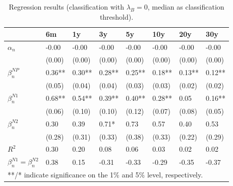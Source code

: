 \documentclass[11pt,a4paper,english,oneside]{book}
\numberwithin{equation}{chapter}
\begin{document}
\begin{table}[h] %
	\centering %
	\begin{tabular}{ p{2cm}  p{1cm} p{1cm} p{1cm} p{1cm} p{1cm} p{1cm} p{1cm} } %
		\toprule %
		& 6m 		& 1y 		& 3y 		& 5y 		& 10y 		& 20y 		& 30y \\
		\midrule %
		$\alpha_n$ & -0.00 & -0.00 & -0.00 & -0.00 & -0.00 & -0.00 & -0.00\\
		& (0.00) & (0.00) & (0.00) & (0.00) & (0.00) & (0.00) & (0.00)\\
		$\beta_n^{NP}$ & 0.36** & 0.30** & 0.28** & 0.25** & 0.18** & 0.13** & 0.12**\\
		& (0.05) & (0.04) & (0.04) & (0.03) & (0.03) & (0.02) & (0.02)\\
		$\beta_n^{N1}$ & 0.68** & 0.54** & 0.39** & 0.40** & 0.28** & 0.05 & 0.16**\\
		& (0.06) & (0.10) & (0.10) & (0.12) & (0.07) & (0.08) & (0.05)\\
		$\beta_n^{N2}$ & 0.30 & 0.39 & 0.71* & 0.73 & 0.57 & 0.40 & 0.53\\
		& (0.28) & (0.31) & (0.33) & (0.38) & (0.33) & (0.22) & (0.29)\\
		$R^2$ & 0.30 & 0.20 & 0.08 & 0.06 & 0.03 & 0.02 & 0.02\\
		$\beta_n^{N1} = \beta_n^{N2}$ & 0.38 & 0.15 & -0.31 & -0.33 & -0.29 & -0.35 & -0.37\\
		\midrule																
		\multicolumn{8}{l}{**/* indicate significance on the 1\% and 5\% level, respectively.} \\
		\bottomrule %
	\end{tabular}
	\caption{Regression results (classification with $\lambda_B=0$, median as classification threshold).} %
	\label{tab:reg1Mod} %
\end{table}
\end{document}
